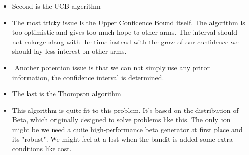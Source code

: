 \documentclass[11pt]{article}
\providecommand{\tightlist}{%
      \setlength{\itemsep}{0pt}\setlength{\parskip}{0pt}}
\begin{document}
    \begin{itemize}
\tightlist
\item
  Second is the UCB algorithm
\item
  The most tricky issue is the Upper Confidence Bound itself. The
  algorithm is too optimistic and gives too much hope to other arms. The
  interval should not enlarge along with the time instead with the grow
  of our confidence we should lay less interest on other arms.
\item
  ​ Another potention issue is that we can not simply use any priror
  information, the confidence interval is determined.
\item
  The last is the Thompson algorithm
\item
  This algorithm is quite fit to this problem. It's based on the
  distribution of Beta, which originally designed to solve problems like
  this. The only con might be we need a quite high-performance beta
  generator at first place and its "robust". We might feel at a lost
  when the bandit is added some extra conditions like cost.
\end{itemize}


    
    
    
    
\end{document}
